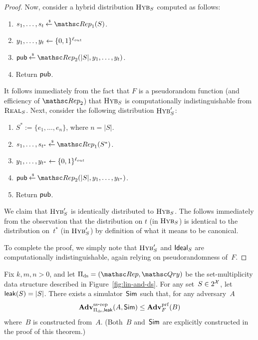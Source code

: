 \begin{proof}
Now, consider a hybrid distribution $\mbox{{\sc Hyb}}_S$ computed as follows:
\begin{enumerate}
\item $s_1, \ldots, s_t \getsr \Rep_1(S)$.
\item $y_1, \ldots, y_t \leftarrow \{0,1\}^{\ell_{out}}$
\item $\pubaux \getsr \Rep_2(|S|, y_1, \ldots, y_t)$.
\item Return ${\sf pub}$.
\end{enumerate}
It follows immediately from the fact that $F$ is a pseudorandom function (and efficiency
of $\Rep_2$) that $\mbox{{\sc Hyb}}_S$ is computationally indistinguishable from $\mbox{{\sc Real}}_S$.
Next, consider the following distribution $\mbox{{\sc Hyb}}'_S$:
\begin{enumerate}
\item $S^* := \{e_1, \ldots, e_n\}$, where $n = |S|$.
\item $s_1, \ldots, s_{t^*} \getsr \Rep_1(S^*)$.
\item $y_1, \ldots, y_{t^*} \leftarrow \{0,1\}^{\ell_{out}}$
\item $\pubaux \getsr \Rep_2(|S|, y_1, \ldots, y_{t^*})$.
\item Return ${\sf pub}$.
\end{enumerate}
We claim that $\mbox{{\sc Hyb}}'_S$ is identically distributed to $\mbox{{\sc Hyb}}_S$. The follows immediately from the
observation that the distribution on $t$ (in $\mbox{{\sc Hyb}}_S$) is identical to the distribution on~$t^*$
(in $\mbox{{\sc Hyb}}'_S$) by definition
of what it means to be canonical.

To complete the proof, we simply note that $\mbox{{\sc Hyb}}'_S$ and $\mbox{{\sf Ideal}}_S$
are computationally indistinguishable, again relying on pseudorandomness of~$F$.
\end{proof}
\begin{theorem}\label{thm:ds-ss}
Fix $k,m,n>0$, and let $\setprim_{\mathrm{ds}}= (\Rep, \Qry)$ be the set-multiplicity data structure described in Figure~\ref{fig:lin-and-ds}.  For any set~$S \in 2^{\cal X}$, let ${\sf leak}(S)=|S|$.  There exists a simulator~${\sf Sim}$ such that, for any adversary~$A$
\[
\mathrm{\mathbf{Adv}}^{\mathrm{ss\mbox{-}rep}}_{\Pi_{\mathrm{ds}},{\sf leak}}(A,{\sf Sim}) \leq  \mathbf{Adv}^{\mathrm{prf}}_{F}(B)
\]
where~$B$ is constructed from~$A$.  (Both~$B$ and~${\sf Sim}$ are explicitly constructed in the proof of this theorem.)
\end{theorem}
